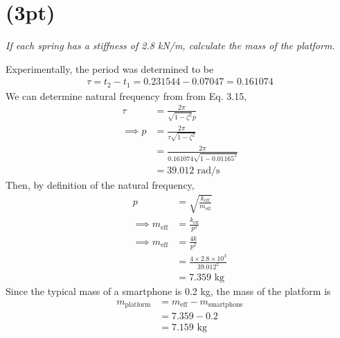 \section{(3pt)}
\textit{If each spring has a stiffness of 2.8 kN/m, calculate the mass of the platform.}

Experimentally, the period was determined to be 
\begin{align*}
    \tau = t_2 - t_1 = 0.231544 - 0.07047 = 0.161074
\end{align*}
We can determine natural frequency from from Eq. 3.15, 
\begin{align*}
    \tau &= \frac{2\pi}{\sqrt{1-\zeta^2} p} \\
    \implies p &= \frac{2\pi}{\tau\sqrt{1-\zeta^2}} \\
    &= \frac{2\pi}{0.161074\sqrt{1-0.01165^2}} \\
    &= 39.012 \text{ rad/s}
\end{align*}
Then, by definition of the natural frequency,
\begin{align*}
    p &= \sqrt{\frac{k_{\text{eff}}}{m_{\text{eff}}}} \\
    \implies m_{\text{eff}} &= \frac{k_{\text{eff}}}{p^2} \\
    \implies m_{\text{eff}} &= \frac{4k}{p^2} \\
    &= \frac{4 \times 2.8\times 10^3}{39.012^2} \\
    &= \boxed{7.359 \text{ kg}}
\end{align*}
Since the typical mass of a smartphone is 0.2 kg, the mass of the platform is 
\begin{align*}
   m_{\text{platform}} &= m_{\text{eff}} - m_{\text{smartphone}} \\
    &= 7.359 - 0.2 \\
    &= \boxed{7.159 \text{ kg}}
\end{align*}